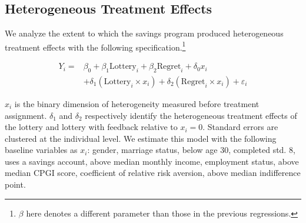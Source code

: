 \documentclass[11pt]{article}
\begin{document}
	\subsection{Heterogeneous Treatment Effects}

		We analyze the extent to which the savings program produced heterogeneous treatment effects with the following specification.\footnote{$\beta$ here denotes a different parameter than those in the previous regressions.}

		\begin{equation} \begin{split}
		Y_{i} = & \beta_{0} + \beta_{1}\text{Lottery}_{i} + \beta_{2}\text{Regret}_{i} + \delta_{0}x_{i} \\
					& + \delta_{1}(\text{Lottery}_{i} \times x_{i}) + \delta_{2}(\text{Regret}_{i} \times x_{i}) + \varepsilon_{i}
		\end{split} \label{eq:heteffect} \end{equation}

		$x_{i}$ is the binary dimension of heterogeneity measured before treatment assignment. $\delta_{1}$ and $\delta_{2}$ respectively identify the heterogeneous treatment effects of the lottery and lottery with feedback relative to $x_{i} = 0$. Standard errors are clustered at the individual level. We estimate this model with the following baseline variables as $x_{i}$: gender, marriage status, below age 30, completed std. 8, uses a savings account, above median monthly income, employment status, above median CPGI score, coefficient of relative risk aversion, above median indifference point.
\end{document}
